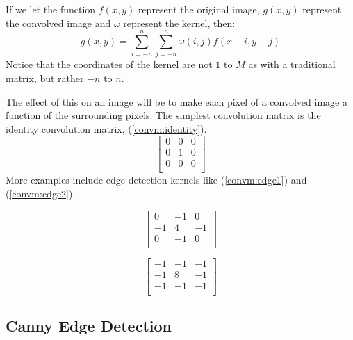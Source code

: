 \documentclass[12pt,english]{article}
\begin{document}
If we let the function $f(x,y)$ represent the original image,
$g(x,y)$ represent the convolved image and $\omega$
represent the kernel, then:
\begin{equation}
	g(x,y)=\sum_{i=-n}^{n}\sum_{j=-n}^{n}\omega(i,j)f(x-i,y-j)
\end{equation}
Notice that the coordinates of the kernel are not $1$ to $M$
as with a traditional matrix, but rather $-n$ to $n$.

The effect of this on an image will be to make each pixel of a
convolved image a function of the surrounding pixels.
The simplest convolution matrix is the identity convolution matrix,
(\ref{convm:identity}).
\begin{equation}
	\label{convm:identity}
	\begin{bmatrix}
		0 & 0 & 0\\
		0 & 1 & 0\\
		0 & 0 & 0\\
	\end{bmatrix}
\end{equation}
More examples include edge detection kernels like
(\ref{convm:edge1}) and (\ref{convm:edge2}).
\begin{center}
\begin{minipage}{.4\linewidth}
\begin{equation} \label{convm:edge1}
	\begin{bmatrix}
		 0 & -1 &  0\\
		-1 &  4 & -1\\
		 0 & -1 &  0\\
	\end{bmatrix}
\end{equation}
\end{minipage}
\begin{minipage}{.4\linewidth}
\begin{equation} \label{convm:edge2}
	\begin{bmatrix}
		-1 & -1 & -1\\
		-1 &  8 & -1\\
		-1 & -1 & -1\\
	\end{bmatrix}
\end{equation}
\end{minipage}
\end{center}

\subsection{Canny Edge Detection}
\end{document}
